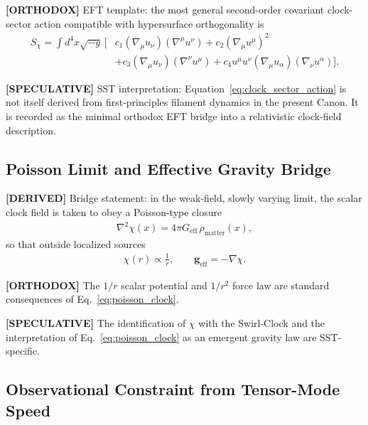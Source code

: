 \documentclass[11pt]{article}
\theoremstyle{definition}
\theoremstyle{plain}
\theoremstyle{remark}
\begin{document}
        \textbf{[ORTHODOX]} EFT template: the most general second-order covariant clock-sector action compatible
        with hypersurface orthogonality is
        \begin{align}
        S_\chi
        =
        \int d^4x \sqrt{-g}\,
        \Big[
        & c_1 (\nabla_\mu u_\nu)(\nabla^\mu u^\nu)
        + c_2 (\nabla_\mu u^\mu)^2 \nonumber\\
        & + c_3 (\nabla_\mu u_\nu)(\nabla^\nu u^\mu)
        + c_4 u^\mu u^\nu (\nabla_\mu u_\alpha)(\nabla_\nu u^\alpha)
        \Big].
        \label{eq:clock_sector_action}
        \end{align}

        \textbf{[SPECULATIVE]} SST interpretation: Equation~\eqref{eq:clock_sector_action} is not itself derived
        from first-principles filament dynamics in the present Canon. It is recorded as the minimal orthodox EFT
        bridge into a relativistic clock-field description.

    \subsection{Poisson Limit and Effective Gravity Bridge}

        \textbf{[DERIVED]} Bridge statement: in the weak-field, slowly varying limit, the scalar clock field is taken to obey
        a Poisson-type closure
        \begin{align}
            \nabla^2 \chi(x)
            =
            4\pi G_{\mathrm{eff}} \,\rho_{\mathrm{matter}}(x),
            \label{eq:poisson_clock}
        \end{align}
        so that outside localized sources
        \begin{align}
            \chi(r) \propto \frac{1}{r},
            \qquad
            \mathbf{g}_{\mathrm{eff}} = - \nabla \chi.
            \label{eq:effective_gravity_clock}
        \end{align}

        \textbf{[ORTHODOX]} The \(1/r\) scalar potential and \(1/r^2\) force law are standard consequences of
        Eq.~\eqref{eq:poisson_clock}.

        \textbf{[SPECULATIVE]} The identification of \(\chi\) with the Swirl-Clock and the interpretation of
        Eq.~\eqref{eq:poisson_clock} as an emergent gravity law are SST-specific.

    \subsection{Observational Constraint from Tensor-Mode Speed}
\end{document}
